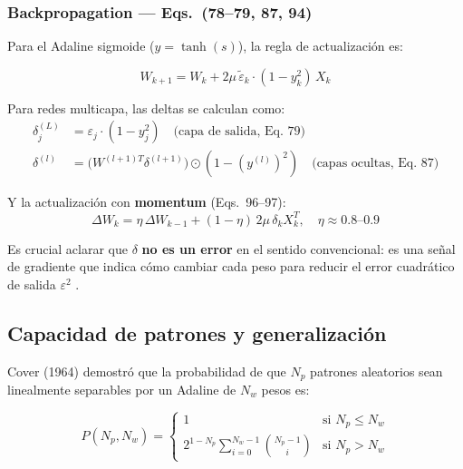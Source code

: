 \documentclass[11pt,a4paper]{article}
\begin{document}
\subsubsection{Backpropagation — Eqs.~(78--79, 87, 94)}

Para el Adaline sigmoide ($y = \tanh(s)$), la regla de actualización es:

\begin{equation}
W_{k+1} = W_k + 2\mu\,\tilde{\varepsilon}_k \cdot (1 - y_k^2)\,X_k
\label{eq:backprop_single}
\end{equation}

Para redes multicapa, las deltas se calculan como:
\begin{align}
\delta^{(L)}_j &= \varepsilon_j \cdot (1 - y_j^2) \quad \text{(capa de salida, Eq.~79)} \label{eq:delta_out}\\
\delta^{(l)} &= \bigl(W^{(l+1)T} \delta^{(l+1)}\bigr) \odot (1 - (y^{(l)})^2) \quad \text{(capas ocultas, Eq.~87)} \label{eq:delta_hid}
\end{align}

Y la actualización con \textbf{momentum} (Eqs.~96--97):
\begin{equation}
\Delta W_k = \eta\,\Delta W_{k-1} + (1-\eta)\,2\mu\,\delta_k X_k^T,\quad \eta \approx 0.8\text{--}0.9
\label{eq:momentum}
\end{equation}

Es crucial aclarar que $\delta$ \textbf{no es un error} en el sentido convencional: es una
señal de gradiente que indica cómo cambiar cada peso para reducir el error cuadrático de salida
$\varepsilon^2$ \cite{widrow1990,rumelhart1986}.

\subsection{Capacidad de patrones y generalización}

Cover (1964) \cite{cover1965} demostró que la probabilidad de que $N_p$ patrones aleatorios sean
linealmente separables por un Adaline de $N_w$ pesos es:

\begin{equation}
P(N_p, N_w) =
\begin{cases}
1 & \text{si } N_p \leq N_w \\[4pt]
2^{1-N_p} \displaystyle\sum_{i=0}^{N_w-1} \binom{N_p-1}{i} & \text{si } N_p > N_w
\end{cases}
\label{eq:cover}
\end{equation}
\end{document}
